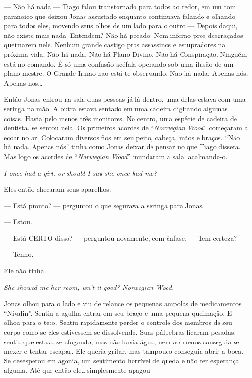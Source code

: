 --- Não há nada --- Tiago falou transtornado para todos ao redor, em um tom paranoico que deixou Jonas assustado\mudanca{,} enquanto continuava falando e olhando para todos eles, movendo seus olhos de um lado para o outro --- Depois daqui, não existe mais nada. Entendem? Não há pecado. Nem inferno pros desgraçados queimarem nele. Nenhum grande castigo pros assassinos e estupradores na próxima vida. Não há nada. Não há Plano Divino. Não há Conspiração. Ninguém está no comando. É só uma confusão acéfala operando sob uma ilusão de um plano-mestre. O Grande Irmão não está te observando. Não há nada. Apenas nós. Apenas nós\ldots

Então Jonas entrou na sala duas pessoas já lá dentro, uma delas estava com uma seringa na mão. A outra estava sentado em uma cadeira digitando algumas coisas. Havia pelo menos três monitores. No centro, uma espécie de cadeira de dentista.  se sentou nela. Os primeiros acordes de ``\emph{Norwegian Wood}'' começaram a ecoar no ar. Colocaram diversos fios em seu peito, cabeça, mãos e braços. ``Não há nada. Apenas nós'' tinha como Jonas deixar de pensar no que Tiago dissera. Mas logo os acordes de ``\emph{Norwegian Wood}'' inundaram a sala, acalmando-o.

\foreignlanguage{english}{\emph{I once had a girl, or should I say she once had me?}}

Eles então checaram seus aparelhos.

--- Está pronto? --- perguntou o que segurava a seringa para Jonas.

--- Estou.

--- Está CERTO disso? --- perguntou novamente, com ênfase. --- Tem certeza?

--- Tenho.

Ele não tinha.

\foreignlanguage{english}{\emph{She showed me her room, isn't it good? Norwegian Wood.}}

Jonas olhou para o lado e viu de relance os pequenas ampolas de medicamentos ``Nivalin''. Sentiu a agulha entrar em seu braço e uma pequena queimação. E olhou para o teto. Sentiu rapidamente perder o controle dos membros de seu corpo como se eles estivessem se dissolvendo. Suas pálpebras ficaram pesadas, sentia que estava se afogando, mas não havia água, nem ao menos conseguia se mexer e tentar escapar. Ele queria gritar, mas tampouco conseguia abrir a boca. Se desesperou em agonia, um sentimento horrível de queda e não ter esperança alguma. Até que\mudanca{,} então\mudanca{,} ele\ldots\,simplesmente apagou.

